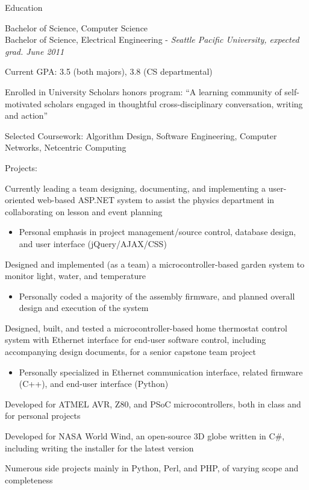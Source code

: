 \documentclass[letterpaper,10pt]{article}
\newenvironment{res_section}[1]{%
  \vskip 6pt
  \noindent
  {\Large \textbf{#1}}\\
  \rule[8pt]{\textwidth}{0.5pt}
  \vskip -8pt
}{
}
\newenvironment{res_subsection}[1]{%
  \vskip 4pt
  \noindent
  \textbf{\large{#1}}
  \begin{itemize}
}{
  \end{itemize}
}
\begin{document}
\begin{res_section}{Education}
\begin{res_subsection}{Bachelor of Science, Computer Science\\
Bachelor of Science, Electrical Engineering - \em{Seattle Pacific University, expected grad. June 2011}
}
  \item Current GPA: 3.5 (both majors), 3.8 (CS departmental)
  \item Enrolled in University Scholars honors program: ``A learning community of self-motivated scholars engaged in thoughtful cross-disciplinary conversation, writing and action''
  \item Selected Coursework: Algorithm Design, Software Engineering, Computer Networks, Netcentric Computing
\end{res_subsection}
\begin{res_subsection}{Projects:}
  \item Currently leading a team designing, documenting, and implementing a user-oriented web-based ASP.NET system  to assist the physics department in collaborating on lesson and event planning
  \begin{itemize}
    \item Personal emphasis in project management/source control, database design, and user interface (jQuery/AJAX/CSS)
  \end{itemize}
  \item Designed and implemented (as a team) a microcontroller-based garden system to monitor light, water, and temperature
  \begin{itemize}
    \item Personally coded a majority of the assembly firmware, and planned overall design and execution of the system
  \end{itemize}
  \item Designed, built, and tested a microcontroller-based home thermostat control system with Ethernet interface for end-user software control, including accompanying design documents, for a senior capstone team project
  \begin{itemize}
    \item Personally specialized in Ethernet communication interface, related firmware (C++), and end-user interface (Python)
  \end{itemize}
  \item Developed for ATMEL AVR, Z80, and PSoC microcontrollers, both in class and for personal projects
  \item Developed for NASA World Wind, an open-source 3D globe written in C\#, including writing the installer for the latest version
  \item Numerous side projects mainly in Python, Perl, and PHP, of varying scope and completeness
\end{res_subsection}
\end{res_section}
\end{document}
